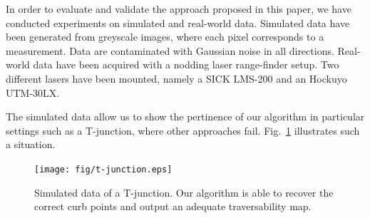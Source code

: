 In order to evaluate and validate the approach proposed in this paper, we have
conducted experiments on simulated and real-world data. Simulated data have been
generated from greyscale images, where each pixel corresponds to a measurement.
Data are contaminated with Gaussian noise in all directions. Real-world data
have been acquired with a nodding laser range-finder setup. Two different lasers
have been mounted, namely a SICK LMS-200 and an Hockuyo UTM-30LX.






The simulated data allow us to show the pertinence of our algorithm in
particular settings such as a T-junction, where other approaches fail.
Fig.~\ref{fig:t-junction} illustrates such a situation.

\begin{figure}[t]
\centering
\texttt{[image: fig/t-junction.eps]}
\caption{Simulated data of a T-junction. Our algorithm is able to recover the
correct curb points and output an adequate traversability map.}
\label{fig:t-junction}
\end{figure}


